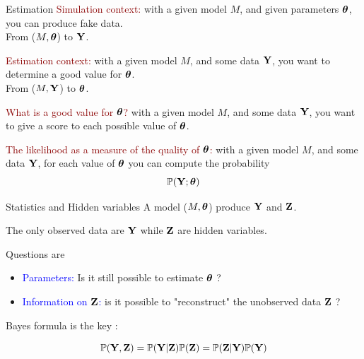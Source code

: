 \documentclass{beamer}\usepackage[]{graphicx}\usepackage[]{color}
\newcommand{\blue}[1]{\textcolor{blue}{#1}}
\newcommand{\emphase}[1]{\textcolor{darkred}{#1}}
\newcommand{\paragraph}[1]{\emphase{#1}}
\renewcommand{\P}{\mathbb{P}}
\newcommand{\Ybf}{{\bf Y}}
\newcommand{\Zbf}{{\bf Z}}
\newcommand{\thetabf}{\mbox{\mathversion{bold}{$\theta$}}}
\begin{document}
\begin{frame}{Estimation}
\paragraph{Simulation context:} with a given model $M$, and given parameters $\thetabf$, you can produce fake data. \\
From ($M, \thetabf$) to $\Ybf$.
\pause

\paragraph{Estimation context:} with a given model $M$, and some data $\Ybf$, you want to determine a good value for $\thetabf$. \\
From ($M, \Ybf$) to $\thetabf$.

\pause
\paragraph{What is a good value for $\thetabf$?} with a given model $M$, and some data $\Ybf$, you want to give a score to each possible value of $\thetabf$. 
\pause

\paragraph{The likelihood as a measure of the quality of $\thetabf$:} with a given model $M$, and some data $\Ybf$, for each value of $\thetabf$ you can compute the probability 
$$\P(\Ybf; \thetabf)$$

\end{frame}


\begin{frame}{Statistics and Hidden variables}
A model ($M, \thetabf$) produce $\Ybf$ and $\Zbf$.
\pause

The only observed data are $\Ybf$ while  $\Zbf$ are hidden variables.
\pause


Questions are 
\begin{itemize}
\item \blue{Parameters:} Is it still possible to estimate $\thetabf$ ?
\item \blue{Information on $\Zbf$:} is it possible to "reconstruct" the unobserved data $\Zbf$ ?
\end{itemize}

\pause

Bayes formula is the key :

$$\P(\Ybf, \Zbf)=\P(\Ybf \vert \Zbf)\P(\Zbf)=\P(\Zbf\vert \Ybf) \P(\Ybf)$$

\end{frame}
\end{document}
